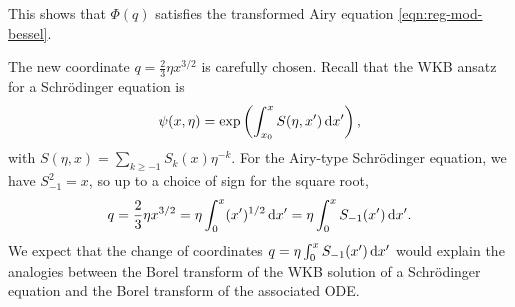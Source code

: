 \documentclass[pdftex]{sigma}
\numberwithin{equation}{section}
\begin{document}
This shows that $\Phi(q)$ satisfies the transformed Airy equation \eqref{eqn:reg-mod-bessel}.

\begin{Remark}
The new coordinate $q = \frac{2}{3}\eta x^{3/2}$ is carefully chosen. Recall that the WKB ansatz for a Schr\"{o}dinger equation is
\[
\psi(x,\eta) = \exp\left(\int_{x_0}^xS(\eta,x')\, {\rm d}x'\right),
\]
with $S(\eta,x)=\sum_{k\geq -1} S_k(x) \eta^{-k}$. For the Airy-type Schr\"odinger equation, we have $S_{-1}^2 = x$, so up to a choice of sign for the square root,
\[ q = \frac{2}{3}\eta x^{3/2}=\eta\int_0^x (x')^{1/2} \, {\rm d}x' = \eta\int_{0}^x S_{-1}(x')\, {\rm d}x'. \]
We expect that the change of coordinates $q=\eta\int_0^{x}S_{-1}(x') \,{\rm d}x'$ would explain the analogies between the Borel transform of the WKB solution of a Schr\"{o}dinger equation and the Borel transform of the associated ODE.
\end{Remark}
\end{document}
